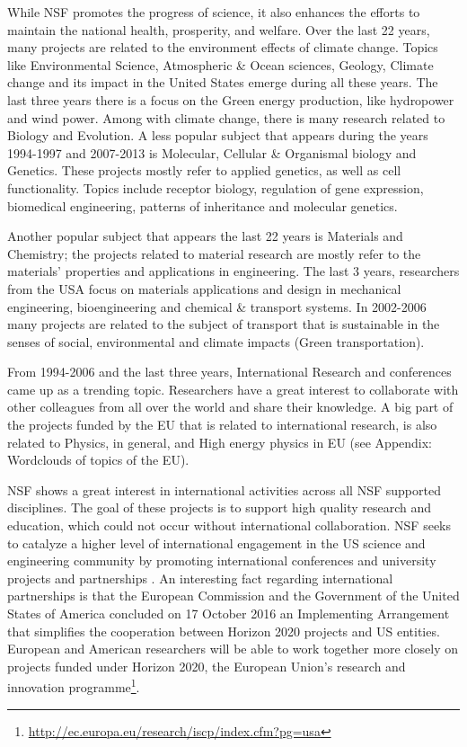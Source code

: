 \documentclass[12pt]{report}
\begin{document}
While NSF promotes the progress of science, it also enhances the efforts to
maintain the national health, prosperity, and welfare. Over the last 22 years,
many projects are related to the environment effects of climate change. Topics
like Environmental Science, Atmospheric \& Ocean sciences, Geology, Climate
change and its impact in the United States emerge during all these years. The
last three years there is a focus on the Green energy production, like
hydropower and wind power. Among with climate change, there is many research
related to Biology and Evolution. A less popular subject that appears during the
years 1994-1997 and 2007-2013 is Molecular, Cellular \& Organismal biology and
Genetics. These projects mostly refer to applied genetics, as well as cell
functionality. Topics include receptor biology, regulation of gene expression,
biomedical engineering, patterns of inheritance and molecular genetics.

Another popular subject that appears the last 22 years is Materials and
Chemistry; the projects related to material research are mostly refer to the
materials' properties and applications in engineering. The last 3 years,
researchers from the USA focus on materials applications and design in
mechanical engineering, bioengineering and chemical \& transport systems. In
2002-2006 many projects are related to the subject of transport that is
sustainable in the senses of social, environmental and climate impacts (Green
transportation).

From 1994-2006 and the last three years, International Research and
conferences came up as a trending topic. Researchers have a great 
interest to collaborate with other
colleagues from all over the world and share their knowledge. A big
part of the projects funded by the EU that is related to international
research, is also related to Physics, in general, and High energy
physics in EU (see Appendix: Wordclouds of topics of the EU).

NSF shows a great interest in international activities across all NSF
supported disciplines. The goal of these projects is to support high
quality research and education, which could not occur without
international collaboration. NSF seeks to catalyze a higher level of
international engagement in the US science and engineering community
by promoting international conferences and university projects and
partnerships .
An interesting fact regarding international partnerships is that the
European Commission and the Government of the United States of America
concluded on 17 October 2016 an Implementing Arrangement that
simplifies the cooperation between Horizon 2020 projects and US
entities. European and American researchers will be able to work
together more closely on projects funded under Horizon 2020, the
European Union's research and innovation
programme\footnote{\url{http://ec.europa.eu/research/iscp/index.cfm?pg=usa}}.
\end{document}
